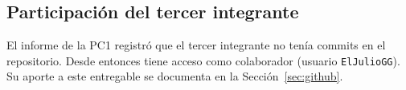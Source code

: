 \subsection{Participación del tercer integrante}

El informe de la PC1 registró que el tercer integrante no tenía commits en el repositorio. Desde
entonces tiene acceso como colaborador (usuario \texttt{ElJulioGG}). Su aporte a este entregable se
documenta en la Sección~\ref{sec:github}.
